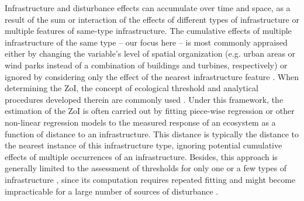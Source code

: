 \documentclass[titlepage]{article}
\begin{document}
Infrastructure and disturbance effects can accumulate over time and space, as a result of the sum or interaction of the effects of different types of infrastructure or multiple features of same-type infrastructure. 
The cumulative effects of multiple infrastructure of the same type -- our focus here -- is most commonly appraised either by changing the variable's level of spatial organization (e.g. urban areas or wind parks instead of a combination of buildings and turbines, respectively) or ignored by considering only the effect of the nearest infrastructure feature \citep[e.g.][]{torres_assessing_2016}. When determining the ZoI, the concept of ecological threshold %
and analytical procedures developed therein are commonly used \citep{ficetola_ecological_2009}. Under this framework, the estimation of the ZoI is often carried out by fitting piece-wise regression or other non-linear regression models \citep[such as an exponential decay or generalized additive models;][]{skarin_out_2018, ficetola_ecological_2009} to the measured response of an ecosystem as a function of distance to an infrastructure. This distance is typically the distance to the nearest instance of this infrastructure type, ignoring potential cumulative effects of multiple occurrences of an infrastructure. Besides, this approach is generally limited to the assessment of thresholds for only one or a few types of infrastructure \citep[e.g.][]{boulanger_estimating_2012}, since its computation requires repeated fitting and might become impracticable for a large number of sources of disturbance \citep{lee_estimating_2020}. 
\end{document}
